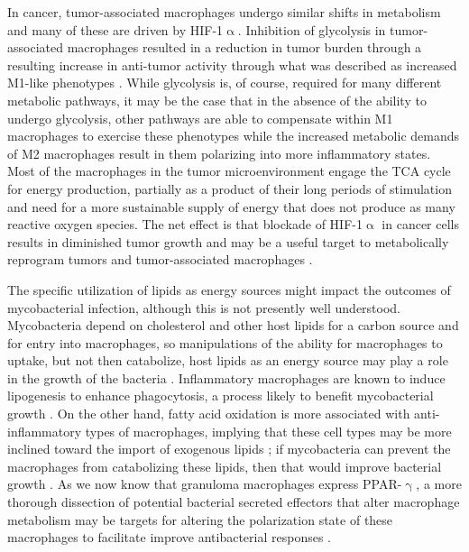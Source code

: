 In cancer, tumor-associated macrophages undergo similar shifts in metabolism and many of these are driven by HIF-1$\upalpha$. Inhibition of glycolysis in tumor-associated macrophages resulted in a reduction in tumor burden through a resulting increase in anti-tumor activity through what was described as increased M1-like phenotypes \citep{Mehla2019}. While glycolysis is, of course, required for many different metabolic pathways, it may be the case that in the absence of the ability to undergo glycolysis, other pathways are able to compensate within M1 macrophages to exercise these phenotypes while the increased metabolic demands of M2 macrophages result in them polarizing into more inflammatory states. Most of the macrophages in the tumor microenvironment engage the TCA cycle for energy production, partially as a product of their long periods of stimulation and need for a more sustainable supply of energy that does not produce as many reactive oxygen species. The net effect is that blockade of HIF-1$\upalpha$ in cancer cells results in diminished tumor growth and may be a useful target to metabolically reprogram tumors and tumor-associated macrophages \citep{Hong2004}.

The specific utilization of lipids as energy sources might impact the outcomes of mycobacterial infection, although this is not presently well understood. Mycobacteria depend on cholesterol and other host lipids for a carbon source and for entry into macrophages, so manipulations of the ability for macrophages to uptake, but not then catabolize, host lipids as an energy source may play a role in the growth of the bacteria \citep{Gatfield2000}. Inflammatory macrophages are known to induce lipogenesis to enhance phagocytosis, a process likely to benefit mycobacterial growth \citep{Yan2020}. On the other hand, fatty acid oxidation is more associated with anti-inflammatory types of macrophages, implying that these cell types may be more inclined toward the import of exogenous lipids \citep{Yan2020}; if mycobacteria can prevent the macrophages from catabolizing these lipids, then that would improve bacterial growth \citep{Nazarova2019}. As we now know that granuloma macrophages express PPAR-$\upgamma$, a more thorough dissection of potential bacterial secreted effectors that alter macrophage metabolism may be targets for altering the polarization state of these macrophages to facilitate improve antibacterial responses \citep{Phan2017, Gideon2022, Cronan2021, Chawla2001}. 

